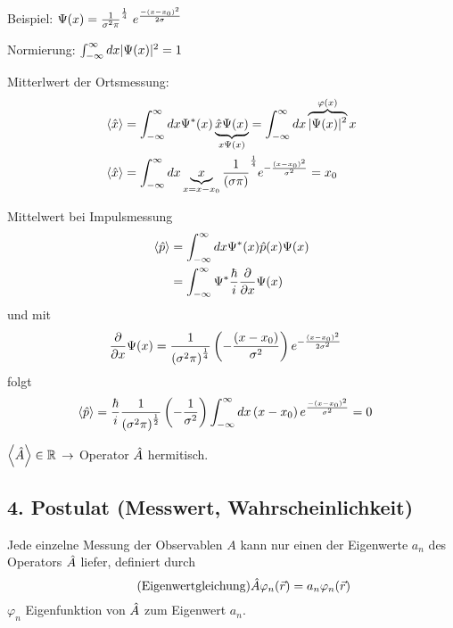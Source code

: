 \begin{bem}
    \item{Beispiel}: $\Psi(x) = \frac{1}{\sigma^2 \pi}^{\frac{1}{4}} \
            e^{\frac{-\left( x-x_0 \right)^2 }{2 \sigma}}$

    Normierung: $\int_{-\infty}^{\infty} dx \lvert \Psi(x)\rvert^2 = 1$

    \begin{erl}{Mitterlwert der Ortsmessung:}
    \begin{align*}
        \left\langle \hat{x} \right\rangle
        &=
        \int_{-\infty}^{\infty} dx \Psi^*(x)
        \underbrace{\hat{x} \Psi(x)}_{x\Psi(x)} 
        =
        \int_{-\infty}^{\infty} dx
        \overbrace{\lvert \Psi(x)\rvert^2}^{\varphi(x)}x \\
        \left\langle \hat{x} \right\rangle
        &=
        \int_{-\infty}^{\infty} dx \underbrace{x}_{x=x-x_0} \frac{1}{\left( \sigma \pi \right)}^{\frac{1}{4}} e^{-\frac{\left( x - x_0 \right)^2}{\sigma^2}}
        = x_0
    \end{align*}
    \end{erl}
    \begin{erl}{Mittelwert bei Impulsmessung}
    \begin{align*}
        \left\langle \hat{p} \right\rangle
        &=
        \int_{-\infty}^{\infty} dx \Psi^*(x)\hat{p}(x)\Psi(x)\\
        &=
        \int_{-\infty}^{\infty} \Psi^* \frac{\hbar}{i}
        \frac{\partial}{\partial x}\Psi(x)
    \end{align*}    
    und mit
    \begin{align*}
       \frac{\partial}{\partial x}\Psi(x) 
       &=
       \frac{1}{{\left( \sigma^2 \pi
       \right)}^{\frac{1}{4}}} \left( - \frac{\left( x- x_0 \right)}{\sigma^2}\right) 
       e^{- \frac{\left( x - x_0 \right)^2}{2\sigma^2}}
    \end{align*}
    folgt
    \begin{align*}
        \left\langle \hat{p} \right\rangle
        &=
        \frac{\hbar}{i} \frac{1}{{\left( \sigma^2 \pi \right)}^{\frac{1}{2}}}
        \left( - \frac{1}{\sigma^2}\right)  \int_{-\infty}^{\infty} dx \left( x - x_0 \right) 
        e^{\frac{- \left( x - x_0 \right)^2}{\sigma^2}} = 0
    \end{align*}
    \end{erl}
    \item
    $\left\langle \hat{A} \right\rangle \in \mathbb{R}$ $\rightarrow$ Operator $\hat{A}$
    hermitisch.
\end{bem}
\subsection{4. Postulat (Messwert, Wahrscheinlichkeit)} %
\label{ssub:4._Postulat_(Messwert,_Wahrscheinlichkeit)}
Jede einzelne Messung der Observablen $A$ kann nur einen der Eigenwerte $a_n$
des Operators $\hat{A}$ liefer, definiert durch
\begin{equation*}
    \tag{Eigenwertgleichung}
    \hat{A}\varphi_n(\vec{r}) = a_n \varphi_n(\vec{r})
\end{equation*}
$\varphi_n$ Eigenfunktion von $\hat{A}$ zum Eigenwert $a_n$.

